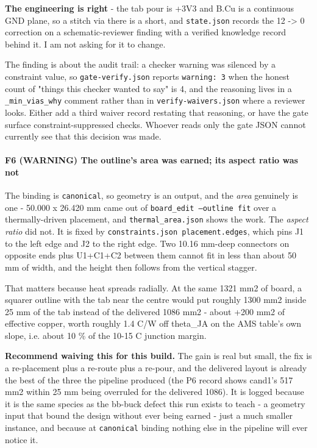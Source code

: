 \documentclass[11pt,a4paper]{article}
\begin{document}
\textbf{The engineering is right} - the tab pour is +3V3 and B.Cu is a continuous GND plane, so a stitch via there is a short, and \texttt{state.json} records the 12 -\textgreater{} 0 correction on a schematic-reviewer finding with a verified knowledge record behind it. I am not asking for it to change.

The finding is about the audit trail: a checker warning was silenced by a constraint value, so \texttt{gate-verify.json} reports \texttt{warning: 3} when the honest count of "things this checker wanted to say" is 4, and the reasoning lives in a \texttt{\_min\_vias\_why} comment rather than in \texttt{verify-waivers.json} where a reviewer looks. Either add a third waiver record restating that reasoning, or have the gate surface constraint-suppressed checks. Whoever reads only the gate JSON cannot currently see that this decision was made.

\paragraph*{F6 (WARNING) The outline's area was earned; its aspect ratio was not}
The binding is \texttt{canonical}, so geometry is an output, and the \emph{area} genuinely is one - 50.000 x 26.420 mm came out of \texttt{board\_edit --outline fit} over a thermally-driven placement, and \texttt{thermal\_area.json} shows the work. The \emph{aspect ratio} did not. It is fixed by \texttt{constraints.json placement.edges}, which pins J1 to the left edge and J2 to the right edge. Two 10.16 mm-deep connectors on opposite ends plus U1+C1+C2 between them cannot fit in less than about 50 mm of width, and the height then follows from the vertical stagger.

That matters because heat spreads radially. At the same 1321 mm2 of board, a squarer outline with the tab near the centre would put roughly 1300 mm2 inside 25 mm of the tab instead of the delivered 1086 mm2 - about +200 mm2 of effective copper, worth roughly 1.4 C/W off theta\_JA on the AMS table's own slope, i.e. about 10 \% of the 10-15 C junction margin.

\textbf{Recommend waiving this for this build.} The gain is real but small, the fix is a re-placement plus a re-route plus a re-pour, and the delivered layout is already the best of the three the pipeline produced (the P6 record shows cand1's 517 mm2 within 25 mm being overruled for the delivered 1086). It is logged because it is the same species as the bb-buck defect this run exists to teach - a geometry input that bound the design without ever being earned - just a much smaller instance, and because at \texttt{canonical} binding nothing else in the pipeline will ever notice it.
\end{document}
